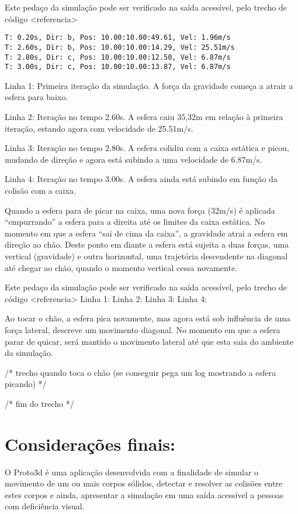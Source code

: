 \documentclass[12pt]{article}
\begin{document}
Este pedaço da simulação pode ser verificado na saída acessível, pelo trecho de código <referencia> 

\begin{lstlisting}[frame=single,caption=Inicialização do ambiente\label{lg:init_world}]
T: 0.20s, Dir: b, Pos: 10.00:10.00:49.61, Vel: 1.96m/s
T: 2.60s, Dir: b, Pos: 10.00:10.00:14.29, Vel: 25.51m/s
T: 2.80s, Dir: c, Pos: 10.00:10.00:12.50, Vel: 6.87m/s
T: 3.00s, Dir: c, Pos: 10.00:10.00:13.87, Vel: 6.87m/s
\end{lstlisting}

Linha 1:  Primeira iteração da simulação. A força da gravidade começa a atrair a esfera para baixo.

Linha 2: Iteração no tempo 2.60s. A esfera caiu 35,32m em relação à primeira iteração, estando agora com velocidade de 25.51m/s.

Linha 3: Iteração no tempo 2.80s. A esfera colidiu com a caixa estática e picou, mudando de direção e agora está subindo a uma velocidade de 6.87m/s. 

Linha 4: Iteração no tempo 3.00s. A esfera ainda está subindo em função da colisão com a caixa.

Quando a esfera para de picar na caixa, uma nova força (32m/s) é aplicada “empurrando” a esfera para a direita até os limites da caixa estática.  No momento em que a esfera “sai de cima da caixa”, a gravidade atrai a esfera em direção ao chão. Deste ponto em diante a esfera está sujeita a duas forças, uma vertical (gravidade) e outra horizontal, uma trajetória descendente na diagonal até chegar ao chão, quando o momento vertical cessa novamente.

Este pedaço da simulação pode ser verificado na saída acessível, pelo trecho de código <referencia> 
Linha 1:  
Linha 2: 
Linha 3: 
Linha 4: 

Ao tocar o chão, a esfera pica novamente, mas agora está sob influência de uma força lateral, descreve um movimento diagonal. No momento em que a esfera parar de quicar, será mantido o movimento lateral até que esta saia do ambiente da simulação.

/* trecho quando toca o chão (se conseguir pega um log mostrando a esfera picando) */

/* fim do trecho */

\section{ Considerações finais:}
O Proto3d é uma aplicação desenvolvida com a finalidade de simular o movimento de um ou mais corpos sólidos, detectar e resolver as colisões entre estes corpos e ainda, apresentar a simulação em uma saída acessível a pessoas com deficiência visual.
\end{document}
